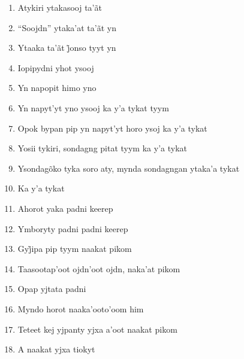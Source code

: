 \begin{enumerate}
 \item Atykiri ytakasooj ta'ãt

 \item ``Soojdn'' ytaka'at ta'ãt yn

 \item Ytaaka ta’ãt j̃onso tyyt yn

 \item Iopipydni yhot ysooj

 \begin{center}\end{center}

 \item Yn napopit himo yno

 \item Yn napyt'yt yno ysooj ka y'a tykat tyym

 \item Opok bypan pip yn napyt'yt horo ysoj ka y'a tykat

 \item Yosii tykiri, sondagng pitat tyym ka y'a tykat

 \begin{center}\end{center}

 \item Ysondagõko tyka soro aty, mynda sondagngan ytaka'a tykat

 \item Ka y'a tykat

 \item Ahorot yaka padni keerep

 \item Ymboryty padni padni keerep

 \begin{center}\end{center}

 \item Gyj̃ipa pip tyym naakat pikom

 \item Taasootap'oot ojdn'oot ojdn, naka'at pikom

 \item Opap yjtata padni

 \item Myndo horot naaka'ooto'oom him

 \item Teteet kej yjpanty yjxa a'oot naakat pikom

 \item A naakat yjxa tiokyt


\end{enumerate}
